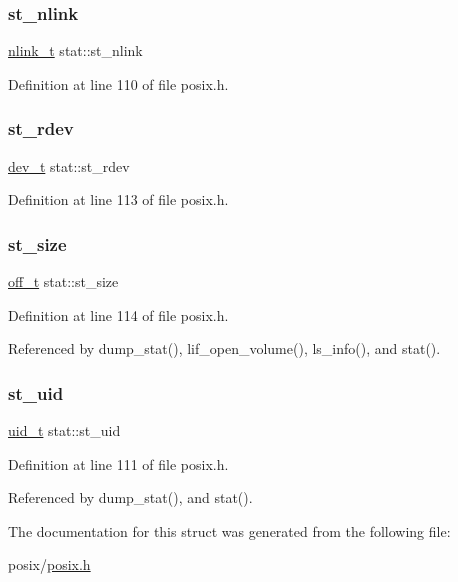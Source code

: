 \mbox{\label{structstat_a0ed9092fa6c77a3251b9b9a4738ef84f}} 
\subsubsection{\texorpdfstring{st\+\_\+nlink}{st\_nlink}}
{\footnotesize\ttfamily \hyperlink{posix_8h_a9e3c03dae15b90102eb1770dd95adadc}{nlink\+\_\+t} stat\+::st\+\_\+nlink}



Definition at line 110 of file posix.\+h.

\mbox{\label{structstat_aa61e6c1a8a91c69f1d26f6700a0546cb}} 
\subsubsection{\texorpdfstring{st\+\_\+rdev}{st\_rdev}}
{\footnotesize\ttfamily \hyperlink{posix_8h_a451f1b5788fa7cc5d33db47a5992e7a6}{dev\+\_\+t} stat\+::st\+\_\+rdev}



Definition at line 113 of file posix.\+h.

\mbox{\label{structstat_a040e19c8b9766f841fde8786ce9297bf}} 
\subsubsection{\texorpdfstring{st\+\_\+size}{st\_size}}
{\footnotesize\ttfamily \hyperlink{posix_8h_aac46e03c2018bada012333c31f41df12}{off\+\_\+t} stat\+::st\+\_\+size}



Definition at line 114 of file posix.\+h.



Referenced by dump\+\_\+stat(), lif\+\_\+open\+\_\+volume(), ls\+\_\+info(), and stat().

\mbox{\label{structstat_a4a8708a3d18be60ee7b2f06c4cab0c70}} 
\subsubsection{\texorpdfstring{st\+\_\+uid}{st\_uid}}
{\footnotesize\ttfamily \hyperlink{posix_8h_a0f43c63879b4ab6960f41e756392c77d}{uid\+\_\+t} stat\+::st\+\_\+uid}



Definition at line 111 of file posix.\+h.



Referenced by dump\+\_\+stat(), and stat().



The documentation for this struct was generated from the following file\+:\begin{DoxyCompactItemize}
\item 
posix/\hyperlink{posix_8h}{posix.\+h}\end{DoxyCompactItemize}
